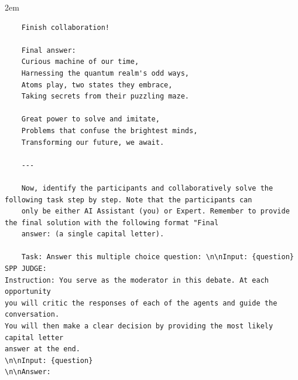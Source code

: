 \begin{adjustwidth}{2em}{}
\begin{enumerate}
\begin{verbatim}
    Finish collaboration!

    Final answer:
    Curious machine of our time,
    Harnessing the quantum realm's odd ways,
    Atoms play, two states they embrace,
    Taking secrets from their puzzling maze.

    Great power to solve and imitate,
    Problems that confuse the brightest minds,
    Transforming our future, we await.

    ---

    Now, identify the participants and collaboratively solve the following task step by step. Note that the participants can 
    only be either AI Assistant (you) or Expert. Remember to provide the final solution with the following format "Final 
    answer: (a single capital letter).

    Task: Answer this multiple choice question: \n\nInput: {question}
SPP JUDGE:
Instruction: You serve as the moderator in this debate. At each opportunity
you will critic the responses of each of the agents and guide the conversation.
You will then make a clear decision by providing the most likely capital letter
answer at the end.
\n\nInput: {question}
\n\nAnswer: 
\end{verbatim}


\end{enumerate}
\end{adjustwidth}
